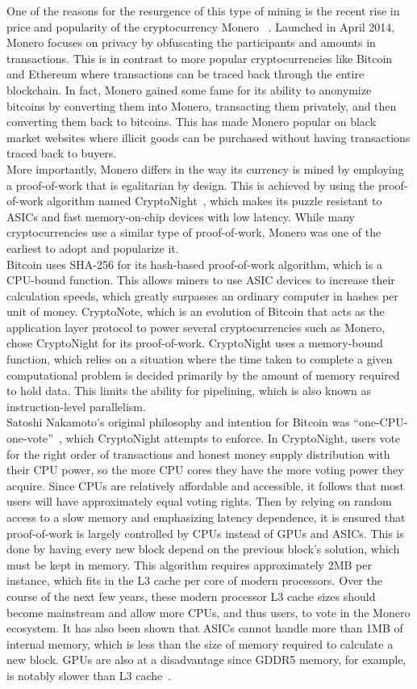 One of the reasons for the resurgence of this type of mining is the recent rise in price and popularity of the cryptocurrency Monero ~\cite{monero}. Launched in April 2014, Monero focuses on privacy by obfuscating the participants and amounts in transactions. This is in contrast to more popular cryptocurrencies like Bitcoin and Ethereum where transactions can be traced back through the entire blockchain. In fact, Monero gained some fame for its ability to anonymize bitcoins by converting them into Monero, transacting them privately, and then converting them back to bitcoins. This has made Monero popular on black market websites where illicit goods can be purchased without having transactions traced back to buyers. 
\\
More importantly, Monero differs in the way its currency is mined by employing a proof-of-work that is egalitarian by design. This is achieved by using the proof-of-work algorithm named CryptoNight~\cite{cryptoknight}, which makes its puzzle resistant to ASICs and fast memory-on-chip devices with low latency. While many cryptocurrencies use a similar type of proof-of-work, Monero was one of the earliest to adopt and popularize it. 
\\
Bitcoin uses SHA-256 for its hash-based proof-of-work algorithm, which is a CPU-bound function. This allows miners to use ASIC devices to increase their calculation speeds, which greatly surpasses an ordinary computer in hashes per unit of money. CryptoNote, which is an evolution of Bitcoin that acts as the application layer protocol to power several cryptocurrencies such as Monero, chose CryptoNight for its proof-of-work. CryptoNight uses a memory-bound function, which relies on a situation where the time taken to complete a given computational problem is decided primarily by the amount of memory required to hold data. This limits the ability for pipelining, which is also known as instruction-level parallelism.  
\\
Satoshi Nakamoto’s original philosophy and intention for Bitcoin was “one-CPU-one-vote”~\cite{nakamoto2008bitcoin}, which CryptoNight attempts to enforce. In CryptoNight, users vote for the right order of transactions and honest money supply distribution with their CPU power, so the more CPU cores they have the more voting power they acquire. Since CPUs are relatively affordable and accessible, it follows that most users will have approximately equal voting rights. Then by relying on random access to a slow memory and emphasizing latency dependence, it is ensured that proof-of-work is largely controlled by CPUs instead of GPUs and ASICs. This is done by having every new block depend on the previous block’s solution, which must be kept in memory. This algorithm requires approximately 2MB per instance, which fits in the L3 cache per core of modern processors. Over the course of the next few years, these modern processor L3 cache sizes should become mainstream and allow more CPUs, and thus users, to vote in the Monero ecosystem. It has also been shown that ASICs cannot handle more than 1MB of internal memory, which is less than the size of memory required to calculate a new block. GPUs are also at a disadvantage since GDDR5 memory, for example, is notably slower than L3 cache~\cite{van2013cryptonote}.  

